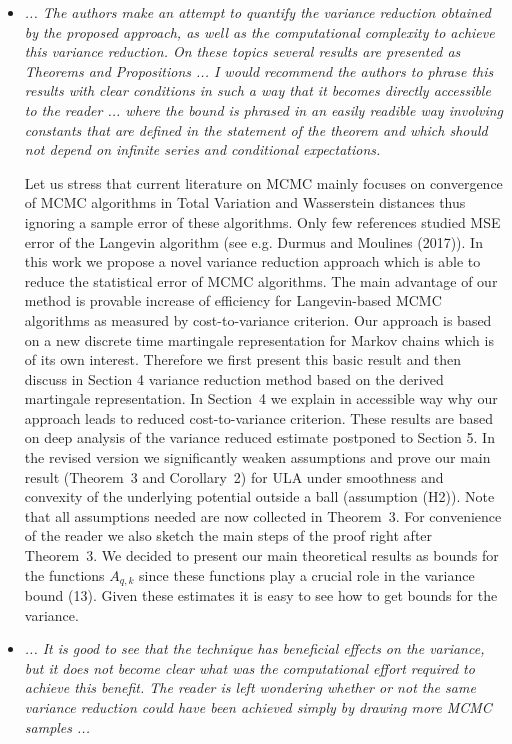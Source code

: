 \documentclass{article}%
\begin{document}
\begin{itemize}

\item \textit{... The authors make an attempt to quantify the variance reduction obtained by the proposed approach, as well as the computational complexity to achieve this variance reduction. On these topics several results are presented as Theorems and Propositions  ... I would recommend the authors to phrase this results with clear conditions in such a way that it becomes directly accessible to the reader ... where the bound is phrased in an easily readible way involving constants that are defined in the statement of the theorem and which should not depend on infinite series and conditional expectations.}
\par
Let us stress that  current literature on MCMC  mainly focuses on  convergence of MCMC algorithms in Total Variation and Wasserstein distances thus  ignoring a sample error of these algorithms. Only few references studied MSE error of the Langevin algorithm (see e.g.  Durmus and  Moulines (2017)). In this work we propose a novel variance reduction approach which is able to reduce the statistical error of MCMC algorithms. The main advantage of our method is provable increase of efficiency for Langevin-based MCMC algorithms as measured by  cost-to-variance criterion. Our approach is based on a new discrete time martingale representation for Markov chains which is of its own interest. Therefore we first present this basic result and then discuss in Section 4 variance reduction method based on the derived martingale representation. In  Section~4 we  explain in accessible way why our approach leads to reduced cost-to-variance criterion. These results are based on deep analysis of the variance reduced estimate postponed to Section 5. In the revised version we significantly weaken  assumptions and prove our main result (Theorem~3 and Corollary~2) for ULA under smoothness  and convexity of the underlying potential outside a ball (assumption  (H2)).   Note that all assumptions needed are now collected in Theorem~3. For convenience of the reader we also sketch the main steps of the proof right after 
Theorem~3. We decided to present our main theoretical results as bounds for the functions $A_{q,k}$ since these functions play a crucial role in the variance bound (13). Given these estimates it is easy to see how to get bounds for the variance. 
\item \textit{... It is good to see that the technique has beneficial effects on the variance, but it does not become clear what was the computational effort required to achieve this benefit. The reader is left wondering whether or not the same variance reduction could have been achieved simply by drawing more MCMC samples ...}

\end{itemize}
\end{document}
